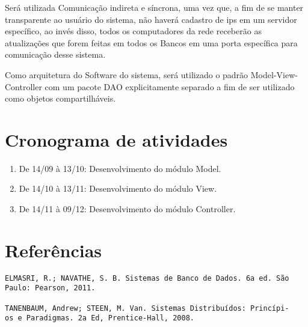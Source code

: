 \documentclass{article}
\begin{document}
Será utilizada Comunicação indireta e síncrona, uma vez que, a fim de se manter transparente ao usuário do sistema, não haverá cadastro de ips em um servidor específico, ao invés disso, todos os computadores da rede receberão as atualizações que forem feitas em todos os Bancos em uma porta específica para comunicação desse sistema.

Como arquitetura do Software do sistema, será utilizado o padrão Model-View-Controller com um pacote DAO explicitamente separado a fim de ser utilizado como objetos compartilháveis.

\section*{Cronograma de atividades}

\begin{enumerate}
\item De 14/09 à 13/10: \hfill Desenvolvimento do módulo Model.
\item De 14/10 à 13/11: \hfill Desenvolvimento do módulo View.
\item De 14/11 à 09/12: \hfill Desenvolvimento do módulo Controller.
\end{enumerate}

\section*{Referências}

\begin{verbatim}
ELMASRI, R.; NAVATHE, S. B. Sistemas de Banco de Dados. 6a ed. São 
Paulo: Pearson, 2011.

TANENBAUM, Andrew; STEEN, M. Van. Sistemas Distribuídos: Princípi- 
os e Paradigmas. 2a Ed, Prentice-Hall, 2008.


\end{verbatim}
\end{document}
